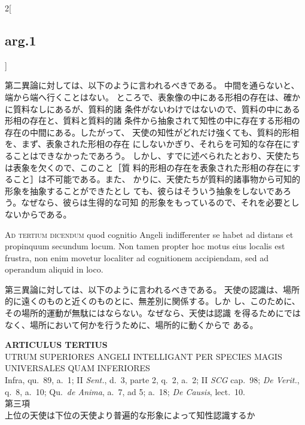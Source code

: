 \documentclass[paper=a4paper,fontsize=10pt,jafontsize=9pt,titlepage]{jlreq}
\begin{document}
\begin{paracol}{2}[\subsection{arg.1}]
\switchcolumn

第二異論に対しては、以下のように言われるべきである。
中間を通らないと、端から端へ行くことはない。
ところで、表象像の中にある形相の存在は、確かに質料なしにあるが、質料的諸
 条件がないわけではないので、質料の中にある形相の存在と、質料と質料的諸
 条件から抽象されて知性の中に存在する形相の存在の中間にある。したがって、
 天使の知性がどれだけ強くても、質料的形相を、まず、表象された形相の存在
 にしないかぎり、それらを可知的な存在にすることはできなかったであろう。
 しかし、すでに述べられたとおり、天使たちは表象を欠くので、このこと［質
 料的形相の存在を表象された形相の存在にすること］は不可能である。また、
 かりに、天使たちが質料的諸事物から可知的形象を抽象することができたとし
 ても、彼らはそういう抽象をしないであろう。なぜなら、彼らは生得的な可知
 的形象をもっているので、それを必要としないからである。

\switchcolumn*[\subsection{ad.3}]

{\scshape Ad tertium dicendum} quod cognitio Angeli indifferenter se
habet ad distans et propinquum secundum locum. Non tamen propter hoc
motus eius localis est frustra, non enim movetur localiter ad
cognitionem accipiendam, sed ad operandum aliquid in loco.

\switchcolumn

第三異論に対しては、以下のように言われるべきである。
天使の認識は、場所的に遠くのものと近くのものとに、無差別に関係する。しか
 し、このために、その場所的運動が無駄にはならない。なぜなら、天使は認識
 を得るためにではなく、場所において何かを行うために、場所的に動くからで
 ある。

\end{paracol}
\newpage
{}
{}
\setcounter{section}{3}
\setcounter{subsection}{0}



\begin{center}
 {\Large {\bfseries ARTICULUS TERTIUS}}\\
 {\large UTRUM SUPERIORES ANGELI INTELLIGANT PER SPECIES MAGIS UNIVERSALES QUAM INFERIORES}\\
 {\footnotesize Infra, qu.~89, a.~1; II {\itshape Sent.}, d.~3, parte 2, q.~2, a.~2; II {\itshape SCG} cap.~98; {\itshape De Verit.}, q.~8, a.~10; Qu.~{\itshape de Anima}, a.~7, ad 5; a.~18; {\itshape De Causis}, lect.~10.}\\
 {\Large 第三項\\上位の天使は下位の天使より普遍的な形象によって知性認識するか}
\end{center}
\end{document}
